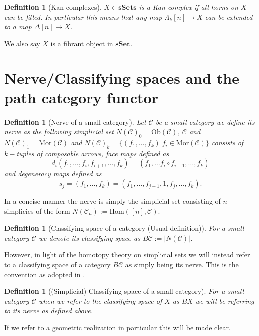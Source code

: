 \documentclass[12pt]{report}
\numberwithin{equation}{section}
\newcommand{\Hom}{{\mathrm{Hom}}}
\newtheorem{definition}[dummy]{Definition}
\begin{document}
	\begin{definition}[Kan complexes]
		$X \in \mathbf{sSets}$ is a Kan complex if all horns on $X$ can be filled. In particular this means that any map $\Lambda_k[n] \to X$ can be extended to a map $\Delta[n] \to X$.
	\end{definition}
	We also say $X$ is a fibrant object in $\mathbf{sSet}$.
	

	
	
	\section{Nerve/Classifying spaces and the path category functor	}
	\begin{definition}[Nerve of a small category]
		Let $\mathcal{C}$ be a small category we define its nerve as the following simplicial set $N(\mathcal{C})_0=\mathrm{Ob}(\mathcal{C})$, $\mathcal{C}$ and $N(\mathcal{C})_1 = \mathrm{Mor}(\mathcal{C})$ and $N(\mathcal{C})_k=\{(f_1,\ldots,f_k)| f_i \in \mathrm{Mor}(\mathcal{C})\}$ consists of $k-$tuples of composable arrows, face maps defined as $$d_i(f_1,\ldots, f_i,f_{i+1}, \ldots, f_k)=(f_1,\ldots f_i\circ f_{i+1}, \ldots, f_k)$$ and degeneracy maps defined as $$s_j=(f_1,\ldots,f_k)=(f_1,\ldots,f_{j-1}, 1, f_j,\ldots,f_k).$$
	\end{definition}
	
	In a concise manner the nerve is simply the simplicial set consisting of $n$-simplicies of the form $N(\mathcal{C}_n):=\Hom([n], \mathcal{C})$.
	

	\begin{definition}[Classifying space of a category (Usual definition)]
		For a small category $\mathcal{C}$ we denote its classifying space as $B\mathcal{C} := |N(\mathcal{C})|$.
	\end{definition}
	
	However, in light of the homotopy theory on simplicial sets we will instead refer to a classifying space of a category $B \mathcal{C}$ as simply being its nerve. This is the convention as adopted in \cite{Goerss_Jardine_2009}.
	
	\begin{definition}[(Simplicial) Classifying space of a small category]
		For a small category \(\mathcal{C}\) when we refer to the classifying space of \(X\) as \(BX\) we will be referring to its nerve as defined above.
	\end{definition}
	
	If we refer to a geometric realization in particular this will be made clear.
	
\end{document}
